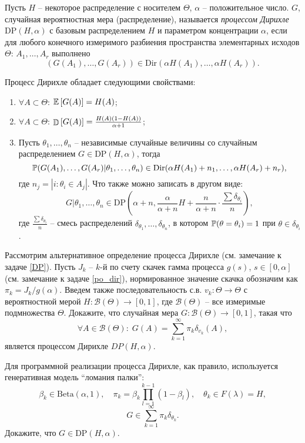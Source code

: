 \begin{remark}
Пусть $H$ -- некоторое распределение с носителем $\Theta$, $\alpha$ -- положительное число. $G$, случайная вероятностная мера (распределение), называется   \textit{процессом Дирихле} $\mathrm{DP}(H, \alpha)$ с базовым распределением $H$ и параметром концентрации $\alpha$, если для любого конечного измеримого разбиения пространства элементарных исходов $\Theta$: $A_1, \ldots, A_r$ выполнено
\[
(G(A_1), \ldots, G(A_r)) \in \mathrm{Dir}(\alpha H(A_1), \ldots, \alpha H(A_r)).
\]

Процесс Дирихле обладает следующими свойствами:
\begin{enumerate}
\item $\forall A \subset \Theta$: $\mathrm{{\mathbb E}} \left[G(A)\right] = H(A)$;
\item $\forall A \subset \Theta$: $\mathop{\mathbb{D}}\nolimits \left[G(A)\right] = \frac{H(A)(1-H(A))}{\alpha+1}$;
\item Пусть $\theta_1, \ldots, \theta_n$ -- независимые случайные величины со случайным распределением $G \in \mathrm{DP}(H, \alpha)$, тогда
\[
\mathrm{{\mathbb P}}(G(A_1), \ldots, G(A_r) | \theta_1, \ldots, \theta_n) \in \mathrm{Dir}(\alpha H(A_1) + n_1, \ldots, \alpha H(A_r) + n_r),
\]
где $n_j = | i: \theta_i \in A_j |$. 
Что также можно записать в другом виде:
\[
G | \theta_1, \ldots, \theta_n \in \mathrm{DP} \left(\alpha + n, \frac{\alpha}{\alpha+n} H + \frac{n}{\alpha+n} \cdot \frac{\sum \delta_{\theta_i}}{n} \right),
\]
где $\frac{\sum \delta_{\theta_i}}{n}$ -- смесь распределений $\delta_{\theta_1}, \ldots, \delta_{\theta_n}$, в котором $\mathrm{{\mathbb P}}(\theta = \theta_i) = 1$ при $\theta \in \delta_{\theta_i}$.   
\end{enumerate}

\end{remark}

\begin{problem}
\label{stick}

Рассмотрим альтернативное определение процесса Дирихле (см. замечание к задаче \ref{DP}). Пусть $J_k$ -- $k$-й по счету скачек гамма процесса $g(s)$, $s \in [0,\alpha]$ (см. замечание к задаче \ref{po_dir}), нормированное значение скачка обозначим как $\pi_k = J_k/g(\alpha)$. Введем также последовательность с.в. $v_k: \Theta \to \Theta$ с вероятностной мерой $H: \mathcal{B}(\Theta) \to [0,1]$, где $\mathcal{B}(\Theta)$ -- все измеримые подмножества $\Theta$. Докажите, что случайная мера $G: \mathcal{B}(\Theta) \to [0,1]$, такая что
\[
\forall A \in \mathcal{B}(\Theta): \; G(A) = \sum_{k = 1}^{\infty} \pi_k \delta_{v_k}(A),
\]
является процессом Дирихле $DP(H, \alpha)$.

Для программной реализации процесса Дирихле, как правило, используется генеративная модель ``ломания палки'':
\[
\beta_k \in \mathrm{Beta}(\alpha, 1),
\quad
\pi_k = \beta_k \prod \limits_{l=1}^{k-1} (1-\beta_l), 
\quad
\theta_k \in F(\lambda) = H,
\]
\[
G \in \sum \limits_{k = 1}^{\infty} \pi_k \delta_{\theta_k}.
\]
Докажите, что $G \in \mathrm{DP}(H, \alpha)$.

\end{problem}

